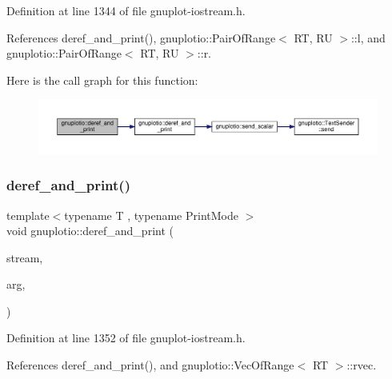 Definition at line 1344 of file gnuplot-\/iostream.\+h.



References deref\+\_\+and\+\_\+print(), gnuplotio\+::\+Pair\+Of\+Range$<$ R\+T, R\+U $>$\+::l, and gnuplotio\+::\+Pair\+Of\+Range$<$ R\+T, R\+U $>$\+::r.

Here is the call graph for this function\+:\nopagebreak
\begin{figure}[H]
\begin{center}
\leavevmode
\includegraphics[width=350pt]{namespacegnuplotio_acd0cb4bd9679f0b75bac15c8afcc10e6_cgraph}
\end{center}
\end{figure}
\mbox{\label{namespacegnuplotio_ae768911c8adb77bfc080d5e4561573e6}} 
\subsubsection{\texorpdfstring{deref\+\_\+and\+\_\+print()}{deref\_and\_print()}\hspace{0.1cm}{\footnotesize\ttfamily [4/4]}}
{\footnotesize\ttfamily template$<$typename T , typename Print\+Mode $>$ \\
void gnuplotio\+::deref\+\_\+and\+\_\+print (\begin{DoxyParamCaption}\item[{std\+::ostream \&}]{stream,  }\item[{const \hyperlink{classgnuplotio_1_1_vec_of_range}{Vec\+Of\+Range}$<$ T $>$ \&}]{arg,  }\item[{Print\+Mode}]{ }\end{DoxyParamCaption})}



Definition at line 1352 of file gnuplot-\/iostream.\+h.



References deref\+\_\+and\+\_\+print(), and gnuplotio\+::\+Vec\+Of\+Range$<$ R\+T $>$\+::rvec.

